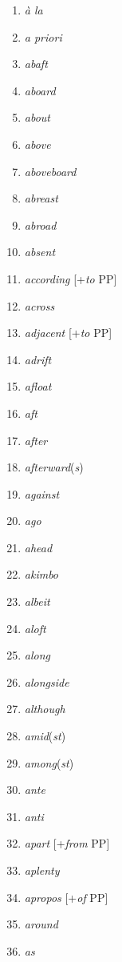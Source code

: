 \begin{multicols}{3}
\begin{enumerate}[noitemsep]
    \item \textit{à la}
    \item \textit{a priori}
    \item \textit{abaft}
    \item \textit{aboard}
    \item \textit{about}
    \item \textit{above}
    \item \textit{aboveboard}
    \item \textit{abreast}
    \item \textit{abroad}
    \item \textit{absent}
    \item \textit{according} [+\textit{to} PP]
    \item \textit{across}
    \item \textit{adjacent} [+\textit{to} PP]
    \item \textit{adrift}
    \item \textit{afloat}
    \item \textit{aft}
    \item \textit{after}
    \item \textit{afterward}(\textit{s})
    \item \textit{against}
    \item \textit{ago}
    \item \textit{ahead}
    \item \textit{akimbo}
    \item \textit{albeit}
    \item \textit{aloft}
    \item \textit{along}
    \item \textit{alongside}
    \item \textit{although}
    \item \textit{amid}(\textit{st})
    \item \textit{among}(\textit{st})
    \item \textit{ante}
    \item \textit{anti}
    \item \textit{apart} [+\textit{from} PP]
    \item \textit{aplenty}
    \item \textit{apropos} [+\textit{of} PP]
    \item \textit{around}
    \item \textit{as}

\end{enumerate}
\end{multicols}
